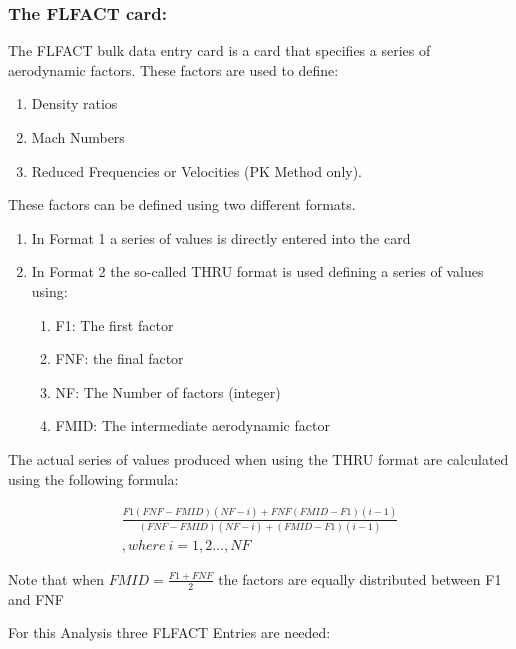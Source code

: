 \subsubsection{The FLFACT card:}

The FLFACT bulk data entry card is a card that specifies a series of
aerodynamic factors. These factors are used to define:

\begin{enumerate}
\def\labelenumi{\arabic{enumi}.}
\item
  Density ratios
\item
  Mach Numbers
\item
  Reduced Frequencies or Velocities (PK Method only).
\end{enumerate}

These factors can be defined using two different formats.

\begin{enumerate}
\def\labelenumi{\arabic{enumi}.}
\item
  In Format 1 a series of values is directly entered into the card
\item
  In Format 2 the so-called THRU format is used defining a series of
  values using:

  \begin{enumerate}
  \def\labelenumii{\alph{enumii}.}
  \item
    F1: The first factor
  \item
    FNF: the final factor
  \item
    NF: The Number of factors (integer)
  \item
    FMID: The intermediate aerodynamic factor
  \end{enumerate}
\end{enumerate}

The actual series of values produced when using the THRU format are
calculated using the following formula:

\begin{multline}
\frac{F1(FNF - FMID)(NF - i) + FNF(FMID - F1)(i - 1)}{(FNF - FMID)(NF - i) + (FMID - F1)(i - 1)}\\ ,where\ i = 1,2\ldots,NF
\end{multline}

Note that when \(FMID = \frac{F1 + FNF}{2}\) the factors are equally
distributed between F1 and FNF

For this Analysis three FLFACT Entries are needed:

